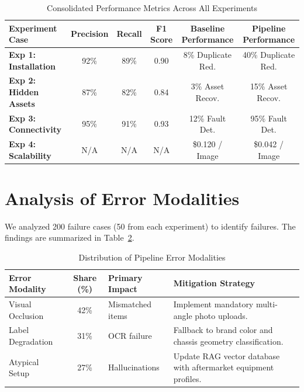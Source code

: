 \documentclass[11pt,letterpaper]{report}
\newcommand{\tableheader}[1]{\textbf{\color{white}#1}}
\begin{document}
\begin{table}[htbp]
\centering
\caption{Consolidated Performance Metrics Across All Experiments}
\label{tab:consolidated_metrics}
\small
\begin{tabular}{@{}lccccc@{}}
\toprule
\tableheader{Experiment Case} & \tableheader{Precision} & \tableheader{Recall} & \tableheader{F1 Score} & \tableheader{Baseline Performance} & \tableheader{Pipeline Performance} \\
\midrule
\textbf{Exp 1: Installation} & 92\% & 89\% & 0.90 & 8\% Duplicate Red. & 40\% Duplicate Red. \\
\rowcolor{tablealt}
\textbf{Exp 2: Hidden Assets} & 87\% & 82\% & 0.84 & 3\% Asset Recov. & 15\% Asset Recov. \\
\textbf{Exp 3: Connectivity} & 95\% & 91\% & 0.93 & 12\% Fault Det. & 95\% Fault Det. \\
\rowcolor{tablealt}
\textbf{Exp 4: Scalability} & N/A & N/A & N/A & \$0.120 / Image & \$0.042 / Image \\
\bottomrule
\end{tabular}
\end{table}

\section{Analysis of Error Modalities}

We analyzed 200 failure cases (50 from each experiment) to identify failures. The findings are summarized in Table~\ref{tab:error_distribution}.

\begin{table}[htbp]
\centering
\caption{Distribution of Pipeline Error Modalities}
\label{tab:error_distribution}
\small
\begin{tabular}{@{}lclp{8cm}@{}}
\toprule
\tableheader{Error Modality} & \tableheader{Share (\%)} & \tableheader{Primary Impact} & \tableheader{Mitigation Strategy} \\
\midrule
Visual Occlusion & 42\% & Mismatched items & Implement mandatory multi-angle photo uploads. \\
\rowcolor{tablealt}
Label Degradation & 31\% & OCR failure & Fallback to brand color and chassis geometry classification. \\
Atypical Setup & 27\% & Hallucinations & Update RAG vector database with aftermarket equipment profiles. \\
\bottomrule
\end{tabular}
\end{table}
\end{document}
